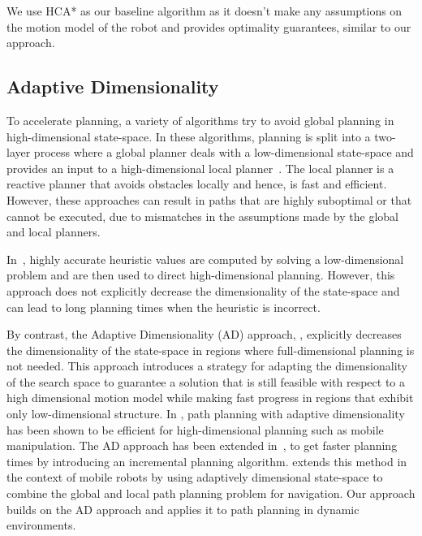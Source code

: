 We use HCA* as our baseline algorithm as it doesn't make any assumptions on the motion model of the robot and provides optimality guarantees, similar to our approach. 

\subsection{Adaptive Dimensionality}
To accelerate planning, a variety of algorithms try to avoid global planning in high-dimensional state-space. 
In these algorithms, planning is split into a two-layer process where a global planner deals with a low-dimensional state-space and provides an input to a high-dimensional local planner~\cite{philippsen2003smooth}. The local planner is a reactive planner that avoids obstacles locally and hence, is fast and efficient. However, these approaches can result in paths that are highly suboptimal or that cannot be executed, due to mismatches in the assumptions made by the global and local planners. 

In~\cite{knepper2006high}, highly accurate heuristic values are computed by solving a low-dimensional problem and are then used to direct high-dimensional planning. However, this approach does not explicitly decrease the dimensionality of the state-space and can lead to long planning times when the heuristic is incorrect. 

By contrast, the Adaptive Dimensionality (AD) approach, \cite{gochev2011path}, explicitly decreases the dimensionality of the state-space in regions where full-dimensional planning is not needed. This approach introduces a strategy for adapting the dimensionality of the search space to guarantee a solution that is still feasible with respect to a high dimensional motion model while making fast progress in regions that exhibit only low-dimensional structure. In \cite{gochev2012planning}, path planning with adaptive dimensionality has been shown to be efficient for high-dimensional planning such as mobile manipulation. The AD approach has been extended in~\cite{gochev2013incremental}, to get faster planning times by introducing an incremental planning algorithm. \cite{zhang2012combining} extends this method in the context of mobile robots by using adaptively dimensional state-space to combine the global and local path planning problem for navigation. Our approach builds on the AD approach and applies it to path planning in dynamic environments.

